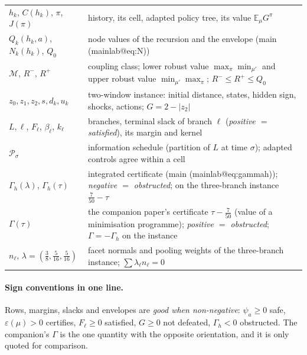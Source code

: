 \documentclass[11pt,a4paper]{article}
\makeatletter
\theoremstyle{plain}
\theoremstyle{definition}
\theoremstyle{remark}
\newcommand{\E}{\mathbb{E}}
\newcommand{\calM}{\mathcal{M}}
\newcommand{\calP}{\mathcal{P}}
\newcommand{\tfr}[2]{\tfrac{#1}{#2}}
\newcommand{\mref}[1]{\csname mainlab@#1\endcsname}
\newcommand{\meqref}[1]{(\mref{#1})}
\makeatother
\begin{document}
\begin{footnotesize}
\begin{longtable}{p{3.0cm}p{11.6cm}}
$h_k$, $C(h_k)$, $\pi$, $J(\pi)$ & history, its cell, adapted policy tree, its value $\E_\mu G^\pi$ \\
$Q_k(h_k,a)$, $N_k(h_k)$, $Q_0$ & node values of the recursion and the envelope (main \meqref{eq:N}) \\
$\calM$, $R^-$, $R^+$ & coupling class; lower robust value $\max_\pi\min_{\mu'}$ and upper robust value $\min_{\mu'}\max_\pi$; $R^-\le R^+\le Q_0$ \\
$z_0,z_1,z_2,s,d_k,u_k$ & two-window instance: initial distance, states, hidden sign, shocks, actions; $G=2-|z_2|$ \\
$L,\ell$, $F_\ell$, $\beta_\ell$, $k_\ell$ & branches, terminal slack of branch $\ell$ (\emph{positive $=$ satisfied}), its margin and kernel \\
$\calP_\sigma$ & information schedule (partition of $L$ at time $\sigma$); adapted controls agree within a cell \\
$\Gamma_h(\lambda)$, $\Gamma_h(\tau)$ & integrated certificate (main \meqref{eq:gammah}); \emph{negative $=$ obstructed}; on the three-branch instance $\tfr7{50}-\tau$ \\
$\Gamma(\tau)$ & the companion paper's certificate $\tau-\tfr7{50}$ (value of a minimisation programme); \emph{positive $=$ obstructed}; $\Gamma=-\Gamma_h$ on the instance \\
$n_\ell$, $\lambda=(\tfr38,\tfr5{16},\tfr5{16})$ & facet normals and pooling weights of the three-branch instance; $\sum\lambda_\ell n_\ell=0$ \\
\end{longtable}
\end{footnotesize}

\paragraph{Sign conventions in one line.} Rows, margins, slacks and envelopes are \emph{good when non-negative}: $\psi_a\ge0$ safe, $\varepsilon(\mu)>0$ certifies, $F_\ell\ge0$ satisfied, $G\ge0$ not defeated, $\Gamma_h<0$ obstructed. The companion's $\Gamma$ is the one quantity with the opposite orientation, and it is only quoted for comparison.
\end{document}
